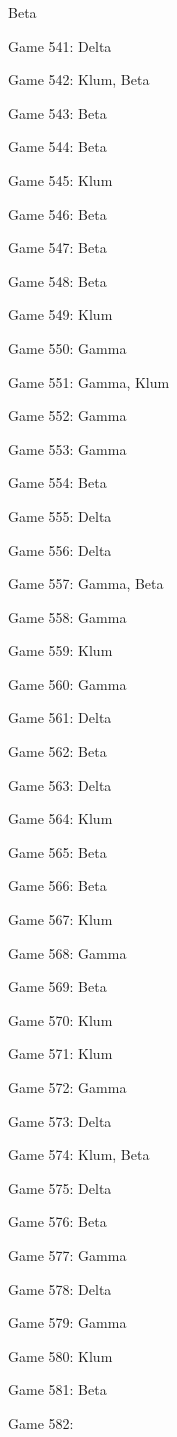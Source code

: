 \documentclass{article}
\begin{document}
\begin{multicols}{3}
\begin{compactitem}
Beta
\item Game 541:
Delta
\item Game 542:
Klum, Beta
\item Game 543:
Beta
\item Game 544:
Beta
\item Game 545:
Klum
\item Game 546:
Beta
\item Game 547:
Beta
\item Game 548:
Beta
\item Game 549:
Klum
\item Game 550:
Gamma
\item Game 551:
Gamma, Klum
\item Game 552:
Gamma
\item Game 553:
Gamma
\item Game 554:
Beta
\item Game 555:
Delta
\item Game 556:
Delta
\item Game 557:
Gamma, Beta
\item Game 558:
Gamma
\item Game 559:
Klum
\item Game 560:
Gamma
\item Game 561:
Delta
\item Game 562:
Beta
\item Game 563:
Delta
\item Game 564:
Klum
\item Game 565:
Beta
\item Game 566:
Beta
\item Game 567:
Klum
\item Game 568:
Gamma
\item Game 569:
Beta
\item Game 570:
Klum
\item Game 571:
Klum
\item Game 572:
Gamma
\item Game 573:
Delta
\item Game 574:
Klum, Beta
\item Game 575:
Delta
\item Game 576:
Beta
\item Game 577:
Gamma
\item Game 578:
Delta
\item Game 579:
Gamma
\item Game 580:
Klum
\item Game 581:
Beta
\item Game 582:

\end{compactitem}
\end{multicols}
\end{document}
